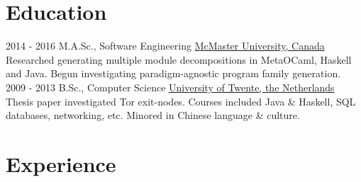 \documentclass[letterpaper]{twentysecondcv} %
\begin{document}
\makeprofile %



\section{Education}

\begin{twenty} %
  \twentyitem
    {2014 - 2016}
    {}
    {M.A.Sc., Software Engineering}%
    {\href{https://www.mcmaster.ca/}{McMaster University, Canada}}
    {}
    {Researched generating multiple module decompositions in MetaOCaml, Haskell and Java. Begun investigating paradigm-agnostic program family generation.}
    \\
  \twentyitem
    {2009 - 2013}
    {}
    {B.Sc., Computer Science}%
    {\href{https://www.utwente.nl/}{University of Twente, the Netherlands}}
    {}
    {Thesis paper investigated Tor exit-nodes. Courses included Java \& Haskell, SQL databases, networking, etc. Minored in Chinese language \& culture.}
\end{twenty}


\section{Experience}
\end{document}
